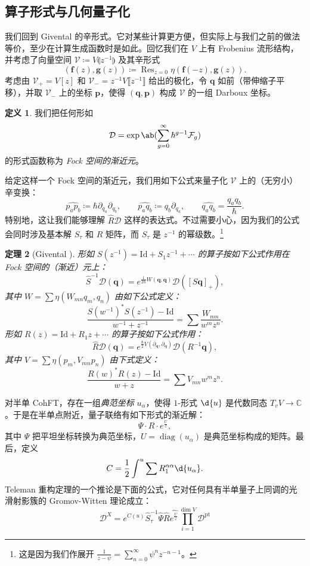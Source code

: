 \documentclass{amsart}
\newtheorem{thm}{定理}[section]
\theoremstyle{definition}
\newtheorem{defn}[thm]{定义}
\theoremstyle{remark}
\theoremstyle{plain}
\theoremstyle{definition}
\theoremstyle{remark}
\newcommand{\C}{\mathbb{C}}
\newcommand{\mc}[1]{\mathcal{#1}}
\newcommand{\mbf}[1]{\mathbf{#1}}
\newcommand{\bq}{\mbf{q}}
\newcommand{\bp}{\mbf{p}}
\newcommand{\mr}[1]{\mathrm{#1}}
\newcommand{\on}[1]{\operatorname{#1}}
\newcommand{\wh}[1]{\widehat{#1}}
\newcommand{\1}{\mathbf{1}}
\newcommand{\2}{\mathbf{2}}
\newcommand{\3}{\mathbf{3}}
\newcommand{\ps}[1]{\llbracket #1 \rrbracket}
\newcommand{\ls}[1]{\llparenthesis #1 \rrparenthesis}
\begin{document}
\subsection{算子形式与几何量子化}%
\label{sub:Operator formalism and geometric quantization}

我们回到 Givental 的辛形式。它对某些计算更方便，但实际上与我们之前的做法等价，至少在计算生成函数时是如此。回忆我们在 $V$ 上有 Frobenius 流形结构，并考虑了向量空间 $\mc{V}\coloneqq V\ls{z^{-1}}$ 及其辛形式
\[ (\mbf{f}(z), \mbf{g}(z)) \coloneqq \on{Res}_{z=0} \eta(\mbf{f}(-z), \mbf{g}(z)). \]
考虑由 $\mc{V}_+ = V[z]$ 和 $\mc{V}_- = z^{-1}V\ps{z^{-1}}$ 给出的极化，令 $\bq$ 如前（带伸缩子平移），并取 $\mc{V}_-$ 上的坐标 $\bp$，使得 $(\bq, \bp)$ 构成 $\mc{V}$ 的一组 Darboux 坐标。

\begin{defn}
    我们把任何形如
    \[ \mc{D} = \exp\ab(\sum_{g=0}^{\infty} \hbar^{g-1} \mc{F}_g) \]
    的形式函数称为 \textit{Fock 空间的渐近元}。
\end{defn}

给定这样一个 Fock 空间的渐近元，我们用如下公式来量子化 $\mc{V}$ 上的（无穷小）辛变换：
\[ \wh{p_a p_b} \coloneqq \hbar \partial_{q_a} \partial_{q_b}, \qquad \wh{p_a q_b} \coloneqq q_b \partial_{q_a}, \qquad \wh{q_a q_b} = \frac{q_a q_b}{\hbar}. \]
特别地，这让我们能够理解 $\hat{R} \mc{D}$ 这样的表达式。不过需要小心，因为我们的公式会同时涉及基本解 $S_{\tau}$ 和 $R$ 矩阵，而 $S_{\tau}$ 是 $z^{-1}$ 的幂级数。\footnote{这是因为我们作展开 $\frac{1}{z-\psi} = \sum_{n=0}^{\infty} \psi^n z^{-n-1}$。}

\begin{thm}[Givental {\cite{Givental2001quantization}}]
    形如 $S(z^{-1}) = \mr{Id} + S_1 z^{-1} + \cdots$ 的算子按如下公式作用在 Fock 空间的（渐近）元上：
    \[ \hat{S}^{-1} \mc{D}(\bq) = e^{\frac{1}{2\hbar}W(\bq,\bq)} \mc{D}([S \bq]_+), \]
    其中 $W = \sum \eta(W_{mn}q_m, q_n)$ 由如下公式定义：
    \[ \frac{S(w^{-1})^* S(z^{-1}) - \mr{Id}}{w^{-1}+z^{-1}} = \sum \frac{W_{mn}}{w^m z^n}. \]
    形如 $R(z) = \mr{Id} + R_1 z + \cdots$ 的算子按如下公式作用：
    \[ \hat{R}\mc{D}(\bq) = e^{\frac{\hbar}{2} V(\partial_{\bq}, \partial_{\bq})} \mc{D}(R^{-1} \bq), \]
    其中 $V = \sum \eta(p_m, V_{mn} p_n)$ 由下式定义：
    \[ \frac{R(w)^* R(z) - \mr{Id}}{w+z} = \sum V_{mn} w^m z^n. \]
\end{thm}

对半单 CohFT，存在一组\textit{典范坐标} $u_{\alpha}$，使得 $1$-形式 $\d{u}$ 是代数同态 $T_v V \to \C$。于是在半单点附近，量子联络有如下形式的渐近解：
\[ \Psi \cdot  R \cdot e^{\frac{U}{z}}, \]
其中 $\Psi$ 把平坦坐标转换为典范坐标，$U = \on{diag}(u_{\alpha})$ 是典范坐标构成的矩阵。最后，定义
\[ C = \frac{1}{2} \int^u \sum R_1^{\alpha\alpha} \d{u_{\alpha}}. \]
Teleman 重构定理的一个推论是下面的公式，它对任何具有半单量子上同调的光滑射影簇的 Gromov-Witten 理论成立：
\[ \mc{D}^X = e^{C(u)} \hat{S}^{-1}_{\tau} \hat{\Psi} \hat{R} \wh{e^{\frac{U}{z}}} \prod_{i=1}^{\dim V} \mc{D}^{\mr{pt}} \]
\end{document}

